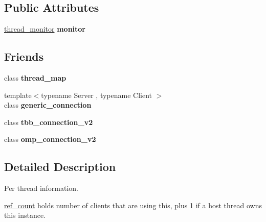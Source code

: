 \subsection*{Public Attributes}
\begin{DoxyCompactItemize}
\item 
\hypertarget{classrml_1_1internal_1_1server__thread_af538de46210035d51ed5b77b1cc30007}{}\hyperlink{classrml_1_1internal_1_1thread__monitor}{thread\+\_\+monitor} {\bfseries monitor}\label{classrml_1_1internal_1_1server__thread_af538de46210035d51ed5b77b1cc30007}

\end{DoxyCompactItemize}
\subsection*{Friends}
\begin{DoxyCompactItemize}
\item 
\hypertarget{classrml_1_1internal_1_1server__thread_aaaf376618c914d70fbb2419523962de3}{}class {\bfseries thread\+\_\+map}\label{classrml_1_1internal_1_1server__thread_aaaf376618c914d70fbb2419523962de3}

\item 
\hypertarget{classrml_1_1internal_1_1server__thread_a3dc721d9f3fd72f194311a7591098f1d}{}{\footnotesize template$<$typename Server , typename Client $>$ }\\class {\bfseries generic\+\_\+connection}\label{classrml_1_1internal_1_1server__thread_a3dc721d9f3fd72f194311a7591098f1d}

\item 
\hypertarget{classrml_1_1internal_1_1server__thread_aa6932b3a74b7975c9aab46274122ae03}{}class {\bfseries tbb\+\_\+connection\+\_\+v2}\label{classrml_1_1internal_1_1server__thread_aa6932b3a74b7975c9aab46274122ae03}

\item 
\hypertarget{classrml_1_1internal_1_1server__thread_a8f6cf095e58cca2d0855ceae6b6d0969}{}class {\bfseries omp\+\_\+connection\+\_\+v2}\label{classrml_1_1internal_1_1server__thread_a8f6cf095e58cca2d0855ceae6b6d0969}

\end{DoxyCompactItemize}


\subsection{Detailed Description}
Per thread information. 

\hyperlink{classrml_1_1internal_1_1ref__count}{ref\+\_\+count} holds number of clients that are using this, plus 1 if a host thread owns this instance. 

